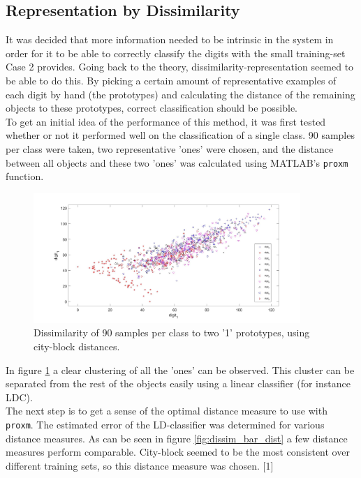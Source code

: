 \subsection{Representation by Dissimilarity}
It was decided that more information needed to be intrinsic in the system in order for it to be able to correctly classify the digits with the small training-set Case 2 provides. Going back to the theory, dissimilarity-representation seemed to be able to do this. By picking a certain amount of representative examples of each digit by hand (the prototypes) and calculating the distance of the remaining objects to these prototypes, correct classification should be possible. \\
\noindent To get an initial idea of the performance of this method, it was first tested whether or not it performed well on the classification of a single class. 90 samples per class were taken, two representative 'ones' were chosen, and the distance between all objects and these two 'ones' was calculated using MATLAB's \texttt{proxm} function. 
\begin{figure}[H]
	\centering
	\includegraphics[width = 0.9\textwidth]{images/dissim_two_ones.jpg}
	\caption{Dissimilarity of 90 samples per class to two '1' prototypes, using city-block distances.}
	\label{fig:dissim_two_ones}
\end{figure}
\noindent In figure \ref{fig:dissim_two_ones} a clear clustering of all the 'ones' can be observed. This cluster can be separated from the rest of the objects easily using a linear classifier (for instance LDC).\\
The next step is to get a sense of the optimal distance measure to use with \texttt{proxm}. The estimated error of the LD-classifier was determined for various distance measures. As can be seen in figure \ref{fig:dissim_bar_dist} a few distance measures perform comparable. City-block seemed to be the most consistent over different training sets, so this distance measure was chosen. [1] \\
